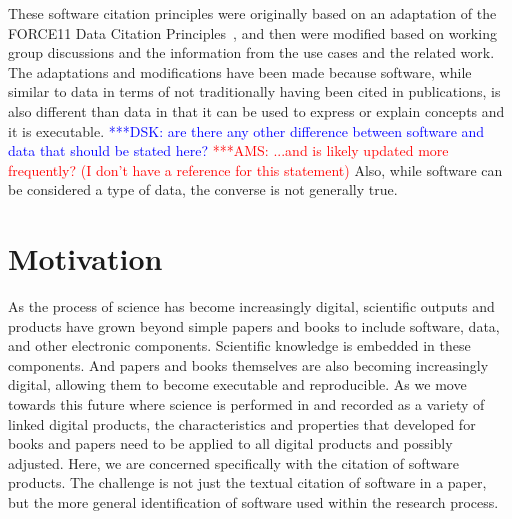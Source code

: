 \documentclass[11pt, oneside]{amsart}
\newcommand{\katznote}[1]{ {\textcolor{blue} { ***DSK: #1 }}} %
\newcommand{\asnote}[1]{ {\textcolor{red} { ***AMS: #1 }}} %
\begin{document}
These software citation principles were originally based on an adaptation of the FORCE11 Data Citation Principles~\cite{data-citation-principles}, and then were modified based on working group discussions and the information from the use cases and the related work.
The adaptations and modifications have been made because software, while similar to data in terms of not traditionally having been cited in publications, is also different than data in that it can be used to express or explain concepts and it is executable.  \katznote{are there any other difference between software and data that should be stated here?} \asnote{...and is likely updated more frequently? (I don't have a reference for this statement)}  Also, while software can be considered a type of data, the converse is not generally true.



\section{Motivation}
\label{sec:intro}

As the process of science has become increasingly digital, scientific outputs and products have
grown beyond simple papers and books to include software, data, and other electronic
components.  Scientific knowledge is embedded in these components.  And papers and books
themselves are also becoming increasingly digital, allowing them to become executable
and reproducible.  As we move towards this future where science is performed in and recorded
as a variety of linked digital products, the characteristics and properties that developed for
books and papers need to be applied to all digital products and possibly adjusted.  Here, we are concerned specifically
with the citation of software products.  The challenge is not just the textual citation of software in a paper, but the more general identification of software used within the research process.
\end{document}
